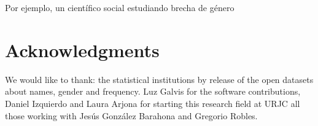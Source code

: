 \documentclass[a4paper]{article}
\begin{document}
Por ejemplo, un científico social estudiando brecha de género


\section*{Acknowledgments}

We would like to thank: the statistical institutions by
release of the open datasets about names, gender and frequency.
Luz Galvis for the software contributions, Daniel Izquierdo and
Laura Arjona for starting this research field at URJC all those
working with Jesús González Barahona and Gregorio Robles. 



\end{document}
